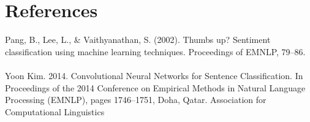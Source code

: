 \documentclass[conference]{IEEEtran}
\begin{document}
\section*{References}
Pang, B., Lee, L., & Vaithyanathan, S. (2002). Thumbs up? Sentiment classification using machine learning techniques. Proceedings of EMNLP, 79–86. 
\\
\\
Yoon Kim. 2014. Convolutional Neural Networks for Sentence Classification. In Proceedings of the 2014 Conference on Empirical Methods in Natural 
Language Processing (EMNLP), pages 1746–1751, Doha, Qatar. Association for Computational Linguistics
\begin{thebibliography}{00}
\bibitem
\end{thebibliography}
\vspace{12pt}
\end{document}
